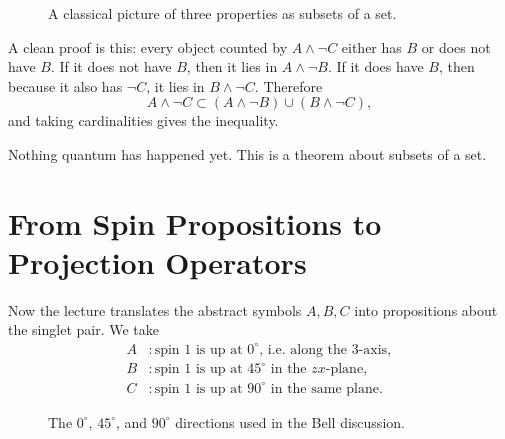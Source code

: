 \begin{figure}[h]
\centering
{}
\caption{A classical picture of three properties as subsets of a set.}
\end{figure}

A clean proof is this: every object counted by \(A\wedge \neg C\) either has \(B\) or does not have \(B\). If it does not have \(B\), then it lies in \(A\wedge \neg B\). If it does have \(B\), then because it also has \(\neg C\), it lies in \(B\wedge \neg C\). Therefore
\[
A\wedge \neg C \subset (A\wedge \neg B)\cup(B\wedge \neg C),
\]
and taking cardinalities gives the inequality.

Nothing quantum has happened yet. This is a theorem about subsets of a set.

\section{From Spin Propositions to Projection Operators}

Now the lecture translates the abstract symbols \(A,B,C\) into propositions about the singlet pair. We take
\begin{align}
A &: \text{spin 1 is up at }0^\circ \text{, i.e. along the }3\text{-axis}, \\
B &: \text{spin 1 is up at }45^\circ \text{ in the }zx\text{-plane}, \\
C &: \text{spin 1 is up at }90^\circ \text{ in the same plane}.
\end{align}

\begin{figure}[h]
\centering
{}
\caption{The \(0^\circ\), \(45^\circ\), and \(90^\circ\) directions used in the Bell discussion.}
\end{figure}

